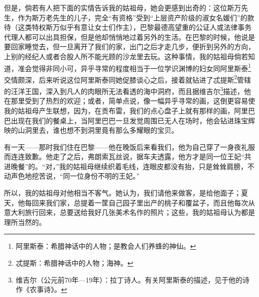 \par 但是，倘若有人把下面的实情告诉我的姑祖母，她会更感到出奇的：这位斯万先生，作为斯万老先生的儿子，完全“有资格”受到“上层资产阶级的淑女名媛们”的款待（这类特权斯万似乎有意让女士们作主），巴黎最德高望重的公证人或法律事务代理人都可以出具担保，但是他却悄悄地过着另外的生活。在巴黎的时候，他说是要回家睡觉去，但一旦离开了我们的家，出门之后才走几步，便折到另外的方向，上别的经纪人或者合股人所不能光顾的沙龙里去玩。这种事情，我的姑祖母倘若知道，准会觉得非同小可，异乎寻常的程度相当于一位学识渊博的妇女同阿里斯泰\footnote{阿里斯泰：希腊神话中的人物；是教会人们养蜂的神仙。}交情颇深，后来听说这位阿里斯泰同她促膝谈心之后，接着就钻进了忒提斯\footnote{忒提斯：希腊神话中的人物；海神。}管辖的汪洋王国，深入到凡人的肉眼所无法看透的海中洞府，而且据维吉尔\footnote{维吉尔（公元前70年—19年）：拉丁诗人。有关阿里斯泰的描述，见于他的诗作《农事诗》。}描述，他在那里受到了热烈的欢迎；或者，简单点说，像一幅异乎寻常的画，这倒更容易使我的姑祖母产生联想，因为，在贡布雷，我们的点心盘子上就有那样的画，阿里巴巴出现在我们的餐桌上，当阿里巴巴一旦发觉周围已无人在场时，他会钻进珠宝辉映的山洞里去，谁也想不到洞里竟有那么多耀眼的宝贝。
\par 有一天——那时我们住在巴黎——他在晚饭后来看我们，他为自己穿了一身夜礼服而连连致歉。他走了之后，弗朗索瓦丝说，据车夫透露，他方才是同一位王妃“共进晚餐”的。“对，”我的姑祖母继续织着毛线，连眼皮都没有抬，只是耸耸肩膀，不动声色地挖苦说，“同一位身份不明的王妃。”
\par 所以，我的姑祖母对他相当不客气。她认为，我们请他来做客，是给他面子；夏天，他每回来我们家，总提着一筐自己园子里出产的桃子和覆盆子，而且他每次从意大利旅行回来，总要送给我好几张美术名作的照片；这些，我的姑祖母认为都是理所当然的。
